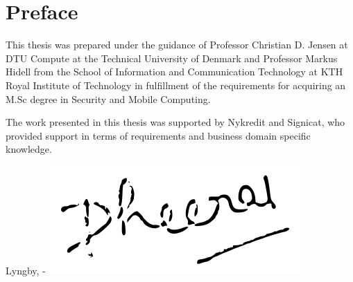 \chapter{Preface}

This thesis was prepared under the guidance of Professor Christian D. Jensen at DTU Compute at the Technical University of Denmark and Professor Markus Hidell from the School of Information and Communication Technology at KTH Royal Institute of Technology in fulfillment of the requirements for acquiring an M.Sc degree in Security and Mobile Computing.

The work presented in this thesis was supported by Nykredit and Signicat, who provided support in terms of requirements and business domain specific knowledge.

\vspace{20mm}
\begin{center}
    \hspace{20mm} Lyngby, \thesishandin-\thesisyear
    \vspace{5mm}
    \newline
    \includegraphics[scale=0.5]{figures/Signature}
\end{center}
\begin{flushright}
    \thesisauthor
\end{flushright}
